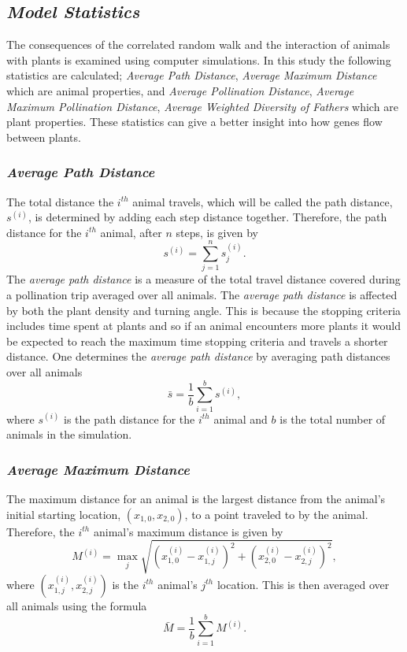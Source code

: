 \documentclass[preprint,12pt]{elsarticle}
\numberwithin{equation}{subsection}
\begin{document}
\subsection{\emph{Model Statistics}}
The consequences of the correlated random walk and the interaction of animals
with plants is examined using computer simulations. In this study the following
statistics are calculated; \emph{Average Path Distance}, \emph{Average Maximum
Distance} which are animal properties, and \emph{Average Pollination Distance},
\emph{Average Maximum Pollination Distance}, \emph{Average Weighted Diversity of
Fathers} which are plant properties. These statistics can give a better insight
into how genes flow between plants.

\subsubsection*{\emph{Average Path Distance}}
The total distance the $i^{th}$ animal travels, which will be called the path
distance, $s^{\left(i\right)}$, is determined by adding each step distance
together. Therefore, the path distance for the $i^{th}$ animal, after $n$ steps,
is given by
\begin{equation} \label{pathD}
	s^{\left(i\right)} = \sum_{j=1}^n s^{\left(i\right)}_j.
\end{equation}
The \emph{average path distance} is a measure of the total travel distance
covered during a pollination trip averaged over all animals. The \emph{average
path distance} is affected by both the plant density and turning angle. This is
because the stopping criteria includes time spent at plants and so if an animal
encounters more plants it would be expected to reach the maximum time stopping
criteria %
and travels a shorter distance. One
determines the \emph{average path distance} by averaging path distances over all
animals
\[
	\bar{s} = \frac{1}{b} \sum_{i=1}^b s^{\left(i\right)},
\]
where $s^{\left(i\right)}$ is the path distance for the $i^{th}$ animal and $b$
is the total number of animals in the simulation.

\subsubsection*{\emph{Average Maximum Distance}}
The maximum distance for an animal is the largest distance from the animal's
initial starting location, $\left(x_{1,0}, x_{2,0}\right)$, to a point traveled
to by the animal. Therefore, the $i^{th}$ animal's maximum distance is given by
\[
		M^{\left(i\right)} = \max_j \sqrt{\left(x^{\left(i\right)}_{1,0}
- x^{\left(i\right)}_{1,j}\right)^2 +
			\left(x^{\left(i\right)}_{2,0} -
x^{\left(i\right)}_{2,j}\right)^2},
\]
where $\left(x^{\left(i\right)}_{1,j}, x^{\left(i\right)}_{2,j}\right)$ is the
$i^{th}$ animal's $j^{th}$ location. This is then averaged over all animals
using the formula
\[
	\bar{M} = \frac{1}{b} \sum_{i=1}^b M^{\left(i\right)}.
\]
\end{document}
